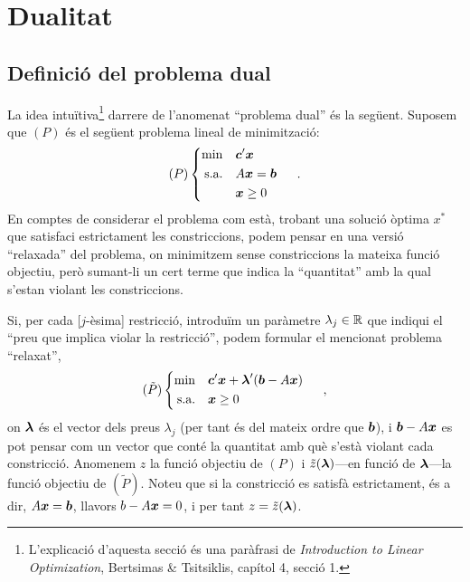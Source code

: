 \chapter{Dualitat}

\section{Definició del problema dual}

La idea intuïtiva\footnote{L'explicació d'aquesta secció és una paràfrasi de
	\textit{Introduction to Linear Optimization}, Bertsimas \& Tsitsiklis, 
	capítol
	4, secció 1.} darrere de l'anomenat ``problema dual'' és la següent. 
	Suposem que
$(P)$ és el següent problema lineal de minimització:
\[
(P)
\begin{cases}
\begin{aligned}
\min 			&&& \boldsymbol{c}'\boldsymbol{x}\\
\text{s.a.}		&&& A\boldsymbol{x} = \boldsymbol{b}\\
&&& \boldsymbol{x}\ge0
\end{aligned}
\end{cases}\ .
\]
En comptes de considerar el problema com està, trobant una solució òptima
$x^\ast$ que satisfaci estrictament les constriccions, podem pensar en una
versió ``relaxada'' del problema, on minimitzem sense constriccions la mateixa
funció objectiu, però sumant-li un cert terme que indica la ``quantitat'' amb la
qual s'estan violant les constriccions. 

Si, per cada [$j$-èsima] restricció, introduïm un paràmetre $\lambda_j\in\mathbb{R}$
que indiqui el ``preu que implica violar la restricció'', podem formular el
mencionat problema ``relaxat'',
\[
(\tilde{P})
\begin{cases}
\begin{aligned}
\min 			&&& \boldsymbol{c}'\boldsymbol{x} + \boldsymbol{\lambda}'(\boldsymbol{b}-A\boldsymbol{x})\\
\text{s.a.}		&&& \boldsymbol{x} \ge 0\\
\end{aligned}
\end{cases}\ ,
\]
on $\boldsymbol{\lambda}$ és el vector dels preus $\lambda_j$ (per tant és del mateix
ordre que $\boldsymbol{b}$), i $\boldsymbol{b}-A\boldsymbol{x}$ es pot pensar com un vector que conté la
quantitat amb què s'està violant cada constricció. Anomenem $z$ la funció
objectiu de $(P)$ i $\tilde{z}(\boldsymbol{\lambda})$---en funció de $\boldsymbol{\lambda}$---la
funció objectiu de $(\tilde{P})$. Noteu que si la constricció es satisfà
estrictament, és a dir, $A\boldsymbol{x}=\boldsymbol{b}$, llavors $b-A\boldsymbol{x} = 0$, i per tant $z
= \tilde{z}(\boldsymbol{\lambda})$.

